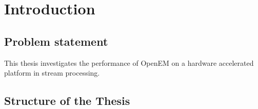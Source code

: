 \chapter{Introduction}
\label{chapter:introduction}


\section{Problem statement}
\label{section:problem-statement}
This thesis investigates the performance of OpenEM on a hardware accelerated platform in stream processing.

\section{Structure of the Thesis}
\label{section:structure}


